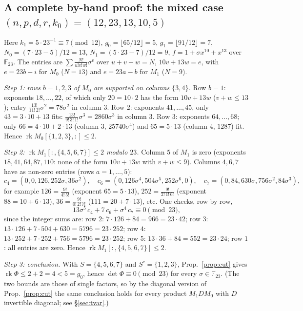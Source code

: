 \documentclass[11pt,a4paper]{article}
\newcommand{\F}{\mathbb{F}}
\begin{document}
\subsection*{A complete by-hand proof: the mixed case $(n,p,d,r,k_0)=(12,23,13,10,5)$}

Here $k_1=5\cdot23^{-1}\equiv7\pmod{12}$, $g_0=\lfloor65/12\rfloor=5$,
$g_1=\lfloor91/12\rfloor=7$, $N_0=(7\cdot23-5)/12=13$,
$N_1=(5\cdot23-7)/12=9$, $f=1+\sigma x^{10}+x^{13}$ over $\F_{23}$. The entries are
$\sum\frac{N!}{u!v!w!}\sigma^v$ over $u+v+w=N$, $10v+13w=e$, with $e=23b-i$ for
$M_0$ ($N=13$) and $e=23a-b$ for $M_1$ ($N=9$).

\emph{Step 1: rows $b=1,2,3$ of $M_0$ are supported on columns $\{3,4\}$.} Row
$b=1$: exponents $18,\dots,22$, of which only $20=10\cdot2$ has the form
$10v+13w$ ($v+w\le13$); entry $\frac{13!}{11!\,2!}\sigma^2=78\sigma^2$ in column
$3$. Row $2$: exponents $41,\dots,45$, only $43=3\cdot10+13$ fits:
$\frac{13!}{9!\,3!\,1!}\sigma^3=2860\sigma^3$ in column $3$. Row $3$: exponents
$64,\dots,68$; only $66=4\cdot10+2\cdot13$ (column $3$, $25740\sigma^4$) and
$65=5\cdot13$ (column $4$, $1287$) fit. Hence
$\operatorname{rk}M_0[\{1,2,3\},:]\le2$.

\emph{Step 2: $\operatorname{rk}M_1[:,\{4,5,6,7\}]\le2$ modulo $23$.} Column $5$
of $M_1$ is zero (exponents $18,41,64,87,110$: none of the form $10v+13w$ with
$v+w\le9$). Columns $4,6,7$ have as non-zero entries (rows $a=1,\dots,5$):
$$c_4=(0,0,126,252\sigma,36\sigma^2),\quad c_6=(0,126\sigma^4,504\sigma^5,252\sigma^6,0),\quad c_7=(0,84,630\sigma,756\sigma^2,84\sigma^3),$$
for example $126=\frac{9!}{4!\,5!}$ (exponent $65=5\cdot13$),
$252=\frac{9!}{2!\,1!\,6!}$ (exponent $88=10+6\cdot13$),
$36=\frac{9!}{0!\,2!\,7!}$ ($111=20+7\cdot13$), etc. One checks, row by row,
$$13\sigma^5\,c_4+7\,c_6+\sigma^4\,c_7\equiv0\pmod{23},$$
since the integer sums are: row $2$: $7\cdot126+84=966=23\cdot42$; row $3$:
$13\cdot126+7\cdot504+630=5796=23\cdot252$; row $4$:
$13\cdot252+7\cdot252+756=5796=23\cdot252$; row $5$: $13\cdot36+84=552=23\cdot24$;
row $1$: all entries are zero. Hence $\operatorname{rk}M_1[:,\{4,5,6,7\}]\le2$.

\emph{Step 3: conclusion.} With $S=\{4,5,6,7\}$ and $S^c=\{1,2,3\}$,
Prop.~\ref{prop:cut} gives $\operatorname{rk}\Phi\le2+2=4<5=g_0$, hence
$\det\Phi\equiv0\pmod{23}$ for every $\sigma\in\F_{23}$. (The two bounds are
those of single factors, so by the diagonal version of Prop.~\ref{prop:cut} the
same conclusion holds for every product $M_1DM_0$ with $D$ invertible diagonal;
see \S\ref{sec:tvar}.)
\end{document}
